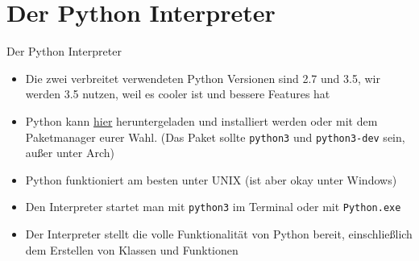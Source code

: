 \section{Der Python Interpreter}
\begin{frame}{Der Python Interpreter}
	\begin{itemize}
    	\item Die zwei verbreitet verwendeten Python Versionen sind 2.7 und 3.5, wir werden 3.5 nutzen, weil es cooler ist und bessere Features hat
		\item Python kann \alert{\href{http://www.python.org}{hier}} heruntergeladen und installiert werden oder mit dem Paketmanager eurer Wahl. (Das Paket sollte \texttt{python3} und \texttt{python3-dev} sein, außer unter Arch)
    	\item Python funktioniert am besten unter UNIX (ist aber okay unter Windows)
    	\item Den Interpreter startet man mit \texttt{python3} im Terminal oder mit \texttt{Python.exe}
    	\item Der Interpreter stellt die volle Funktionalität von Python bereit, einschließlich dem Erstellen von Klassen und Funktionen
	\end{itemize}
\end{frame}

